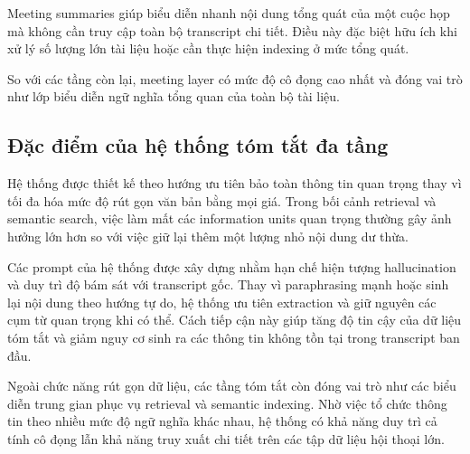 Meeting summaries giúp biểu diễn nhanh nội dung tổng quát của một cuộc họp mà không cần truy cập toàn bộ transcript chi tiết. Điều này đặc biệt hữu ích khi xử lý số lượng lớn tài liệu hoặc cần thực hiện indexing ở mức tổng quát.

So với các tầng còn lại, meeting layer có mức độ cô đọng cao nhất và đóng vai trò như lớp biểu diễn ngữ nghĩa tổng quan của toàn bộ tài liệu.

\subsection{Đặc điểm của hệ thống tóm tắt đa tầng}

Hệ thống được thiết kế theo hướng ưu tiên bảo toàn thông tin quan trọng thay vì tối đa hóa mức độ rút gọn văn bản bằng mọi giá. Trong bối cảnh retrieval và semantic search, việc làm mất các information units quan trọng thường gây ảnh hưởng lớn hơn so với việc giữ lại thêm một lượng nhỏ nội dung dư thừa.

Các prompt của hệ thống được xây dựng nhằm hạn chế hiện tượng hallucination và duy trì độ bám sát với transcript gốc. Thay vì paraphrasing mạnh hoặc sinh lại nội dung theo hướng tự do, hệ thống ưu tiên extraction và giữ nguyên các cụm từ quan trọng khi có thể. Cách tiếp cận này giúp tăng độ tin cậy của dữ liệu tóm tắt và giảm nguy cơ sinh ra các thông tin không tồn tại trong transcript ban đầu.

Ngoài chức năng rút gọn dữ liệu, các tầng tóm tắt còn đóng vai trò như các biểu diễn trung gian phục vụ retrieval và semantic indexing. Nhờ việc tổ chức thông tin theo nhiều mức độ ngữ nghĩa khác nhau, hệ thống có khả năng duy trì cả tính cô đọng lẫn khả năng truy xuất chi tiết trên các tập dữ liệu hội thoại lớn.